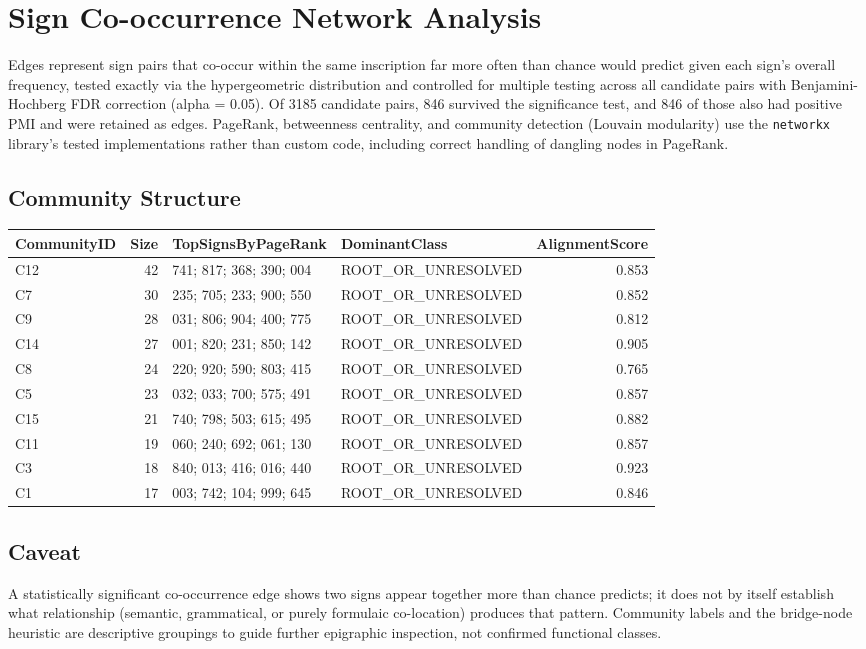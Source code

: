 \section{Sign Co-occurrence Network Analysis}

Edges represent sign pairs that co-occur within the same inscription far more
often than chance would predict given each sign's overall frequency, tested
exactly via the hypergeometric distribution and controlled for multiple
testing across all candidate pairs with Benjamini-Hochberg FDR correction
(alpha = 0.05). Of 3185 candidate pairs, 846 survived
the significance test, and 846 of those also had positive PMI and were
retained as edges. PageRank, betweenness centrality, and community detection
(Louvain modularity) use the \texttt{networkx} library's tested
implementations rather than custom code, including correct handling of
dangling nodes in PageRank.

\subsection{Community Structure}
\begin{tabular}{lrp{}lr}
\toprule
\textbf{CommunityID} & \textbf{Size} & \textbf{TopSignsByPageRank} & \textbf{DominantClass} & \textbf{AlignmentScore} \\
\midrule
C12 & 42 & 741; 817; 368; 390; 004 & ROOT\_OR\_UNRESOLVED & 0.853 \\
C7 & 30 & 235; 705; 233; 900; 550 & ROOT\_OR\_UNRESOLVED & 0.852 \\
C9 & 28 & 031; 806; 904; 400; 775 & ROOT\_OR\_UNRESOLVED & 0.812 \\
C14 & 27 & 001; 820; 231; 850; 142 & ROOT\_OR\_UNRESOLVED & 0.905 \\
C8 & 24 & 220; 920; 590; 803; 415 & ROOT\_OR\_UNRESOLVED & 0.765 \\
C5 & 23 & 032; 033; 700; 575; 491 & ROOT\_OR\_UNRESOLVED & 0.857 \\
C15 & 21 & 740; 798; 503; 615; 495 & ROOT\_OR\_UNRESOLVED & 0.882 \\
C11 & 19 & 060; 240; 692; 061; 130 & ROOT\_OR\_UNRESOLVED & 0.857 \\
C3 & 18 & 840; 013; 416; 016; 440 & ROOT\_OR\_UNRESOLVED & 0.923 \\
C1 & 17 & 003; 742; 104; 999; 645 & ROOT\_OR\_UNRESOLVED & 0.846 \\
\bottomrule
\end{tabular}

\subsection*{Caveat}
A statistically significant co-occurrence edge shows two signs appear
together more than chance predicts; it does not by itself establish what
relationship (semantic, grammatical, or purely formulaic co-location) produces
that pattern. Community labels and the bridge-node heuristic are descriptive
groupings to guide further epigraphic inspection, not confirmed functional
classes.
